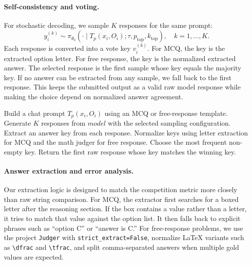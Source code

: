 \documentclass{article}
\begin{document}
\paragraph{Self-consistency and voting.}
For stochastic decoding, we sample $K$ responses for the same prompt:
\begin{equation}
  y_i^{(k)} \sim \pi_{\theta_0}(\cdot \mid T_p(x_i,O_i); \tau, p_{\mathrm{top}}, k_{\mathrm{top}}),
  \quad k=1,\ldots,K.
\end{equation}
Each response is converted into a vote key $v_i^{(k)}$. For MCQ, the key is the extracted option letter. For free response, the key is the normalized extracted answer. The selected response is the first sample whose key equals the majority key. If no answer can be extracted from any sample, we fall back to the first response. This keeps the submitted output as a valid raw model response while making the choice depend on normalized answer agreement.

\begin{algorithm}[H]
\caption{Inference with extraction-level self-consistency}
\label{alg:sc}
\begin{algorithmic}[1]
\STATE Build a chat prompt $T_p(x_i,O_i)$ using an MCQ or free-response template.
\STATE Generate $K$ responses from $ model{}$ with the selected sampling configuration.
\STATE Extract an answer key from each response.
\STATE Normalize keys using letter extraction for MCQ and the math judger for free response.
\STATE Choose the most frequent non-empty key.
\STATE Return the first raw response whose key matches the winning key.
\end{algorithmic}
\end{algorithm}

\paragraph{Answer extraction and error analysis.}
Our extraction logic is designed to match the competition metric more closely than raw string comparison. For MCQ, the extractor first searches for a boxed letter after the reasoning section. If the box contains a value rather than a letter, it tries to match that value against the option list. It then falls back to explicit phrases such as ``option C'' or ``answer is C.'' For free-response problems, we use the project \texttt{Judger} with \texttt{strict\_extract=False}, normalize LaTeX variants such as \verb|\dfrac| and \verb|\tfrac|, and split comma-separated answers when multiple gold values are expected.
\end{document}
